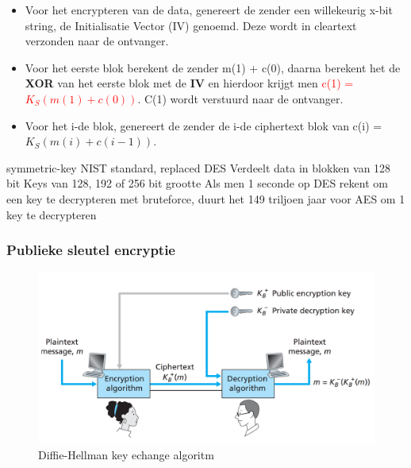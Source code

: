 \begin{itemize}

\item Voor het encrypteren van de data, genereert de zender een willekeurig x-bit string, de Initialisatie Vector (IV) genoemd. Deze wordt in cleartext verzonden naar de ontvanger.

\item Voor het eerste blok berekent de zender m(1) + c(0), daarna berekent het de \textbf{XOR} van het eerste blok met de \textbf{IV} en hierdoor krijgt men \textcolor{red}{c(1) = $K_S(m(1) + c(0))$}. C(1) wordt verstuurd naar de ontvanger.

\item Voor het i-de blok, genereert de zender de i-de ciphertext blok van c(i) = $K_S(m(i) + c(i-1))$.

\end{itemize}

\bi
\itf symmetric-key NIST standard, replaced DES
\itf Verdeelt data in blokken van 128 bit
\itf Keys van 128, 192 of 256 bit grootte
\itf Als men 1 seconde op DES rekent om een key te decrypteren met bruteforce, duurt het 149 triljoen jaar voor AES om 1 key te decrypteren
\ei

\newpage

\subsubsection{Publieke sleutel encryptie}

\begin{figure}[h]
    \centering
    \includegraphics[width=7in]{./img/imghfdst8/Figure8-6.PNG}
    \caption{Diffie-Hellman key echange algoritm }      
    \label{fig:Diffie-Hellman key echange algoritm }
\end{figure}


